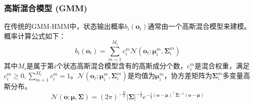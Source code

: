 \subsubsection{高斯混合模型 (GMM)}
在传统的GMM-HMM中，状态输出概率$b_i(\mathbf{o}_t)$通常由一个高斯混合模型来建模。概率计算公式如下：
\begin{equation}
    b_i(\mathbf{o}_t)=\sum_{m=1}^{M_i}c^m_{i}\mathcal{N}(\mathbf{o}_t;\bm{\mu}^m_{i},\bm{\Sigma}^m_{i})
\end{equation}
其中$M_i$是属于第$i$个状态高斯混合模型含有的高斯成分个数，$c^m_{i}$是混合权重，满足$c^m_{i} \ge 0, \sum_{m=1}^{M_i} c^m_{i}=1$。$\mathcal{N}(\mathbf{o}_t;\bm{\mu}^m_{i},\bm{\Sigma}^m_{i})$是均值为$\bm{\mu}^m_{i}$，协方差矩阵为$\bm{\Sigma}^m_{i}$多变量高斯分布。
\begin{equation}
    \mathcal{N}(\mathbf{o};\bm{\mu},\bm{\Sigma})=(2\pi)^{-\frac{D}{2}}{|\bm{\Sigma}|}^{-\frac{1}{2}}e^{-\frac{1}{2}(\mathbf{o}-\bm{\mu})^{\top}\bm{\Sigma}^{-1}(\mathbf{o}-\bm{\mu})}
\end{equation}

